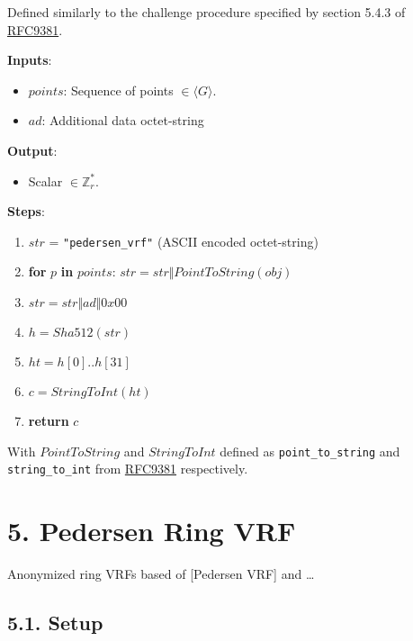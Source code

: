 \documentclass[
]{article}
\providecommand{\tightlist}{%
  \setlength{\itemsep}{0pt}\setlength{\parskip}{0pt}}
\begin{document}
Defined similarly to the challenge procedure specified by section 5.4.3
of \href{https://datatracker.ietf.org/doc/rfc9381/}{RFC9381}.

\textbf{Inputs}:

\begin{itemize}
\tightlist
\item
  \(points\): Sequence of points \(\in \langle G \rangle\).
\item
  \(ad\): Additional data octet-string
\end{itemize}

\textbf{Output}:

\begin{itemize}
\tightlist
\item
  Scalar \(\in \mathbb{Z}^*_r\).
\end{itemize}

\textbf{Steps}:

\begin{enumerate}
\def\labelenumi{\arabic{enumi}.}
\tightlist
\item
  \(str\) = \texttt{"pedersen\_vrf"} (ASCII encoded octet-string)
\item
  \textbf{for} \(p\) \textbf{in} \(points\):
  \(str = str \Vert PointToString(obj)\)
\item
  \(str = str \Vert ad \Vert 0x00\)
\item
  \(h = Sha512(str)\)
\item
  \(ht = h[0] .. h[31]\)
\item
  \(c = StringToInt(ht)\)
\item
  \textbf{return} \(c\)
\end{enumerate}

With \(PointToString\) and \(StringToInt\) defined as
\texttt{point\_to\_string} and \texttt{string\_to\_int} from
\href{https://datatracker.ietf.org/doc/rfc9381/}{RFC9381} respectively.

\hypertarget{pedersen-ring-vrf}{%
\section{5. Pedersen Ring VRF}\label{pedersen-ring-vrf}}

Anonymized ring VRFs based of {[}Pedersen VRF{]} and \ldots{}

\hypertarget{setup-1}{%
\subsection{5.1. Setup}\label{setup-1}}
\end{document}
